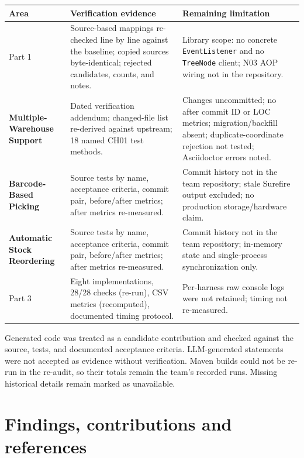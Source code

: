 \documentclass[11pt,a4paper]{article}
\newcommand{\code}[1]{\nolinkurl{#1}}
\begin{document}
\begin{tabularx}{\linewidth}{@{}lYY@{}}
\toprule
Area & Verification evidence & Remaining limitation\\
\midrule
Part 1 & Source-based mappings re-checked line by line against the baseline; copied sources byte-identical; rejected candidates, counts, and notes. & Library scope: no concrete \code{EventListener} and no \code{TreeNode} client; N03 AOP wiring not in the repository.\\
\textbf{Multiple-Warehouse Support} & Dated verification addendum; changed-file list re-derived against upstream; 18 named CH01 test methods. & Changes uncommitted; no after commit ID or LOC metrics; migration/backfill absent; duplicate-coordinate rejection not tested; Asciidoctor errors noted.\\
\textbf{Barcode-Based Picking} & Source tests by name, acceptance criteria, commit pair, before/after metrics; after metrics re-measured. & Commit history not in the team repository; stale Surefire output excluded; no production storage/hardware claim.\\
\textbf{Automatic Stock Reordering} & Source tests by name, acceptance criteria, commit pair, before/after metrics; after metrics re-measured. & Commit history not in the team repository; in-memory state and single-process synchronization only.\\
Part 3 & Eight implementations, 28/28 checks (re-run), CSV metrics (recomputed), documented timing protocol. & Per-harness raw console logs were not retained; timing not re-measured.\\
\bottomrule
\end{tabularx}

Generated code was treated as a candidate contribution and checked against the source, tests, and documented acceptance criteria. LLM-generated statements were not accepted as evidence without verification. Maven builds could not be re-run in the re-audit, so their totals remain the team's recorded runs. Missing historical details remain marked as unavailable.

\section{Findings, contributions and references}
\end{document}
